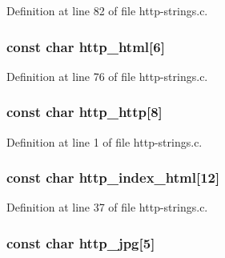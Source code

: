 Definition at line 82 of file http-\/strings.c.

\hypertarget{http-strings_8h_ac61a385f177ab70118739cc3e38c11af}{
\subsubsection[{http\_\-html}]{\setlength{\rightskip}{0pt plus 5cm}const char {\bf http\_\-html}\mbox{[}6\mbox{]}}}
\label{http-strings_8h_ac61a385f177ab70118739cc3e38c11af}


Definition at line 76 of file http-\/strings.c.

\hypertarget{http-strings_8h_acaaccd24059edb3f7a8182b1d6b83c78}{
\subsubsection[{http\_\-http}]{\setlength{\rightskip}{0pt plus 5cm}const char {\bf http\_\-http}\mbox{[}8\mbox{]}}}
\label{http-strings_8h_acaaccd24059edb3f7a8182b1d6b83c78}


Definition at line 1 of file http-\/strings.c.

\hypertarget{http-strings_8h_ae3489af8c42b05e3c9f786e3f7be2d2f}{
\subsubsection[{http\_\-index\_\-html}]{\setlength{\rightskip}{0pt plus 5cm}const char {\bf http\_\-index\_\-html}\mbox{[}12\mbox{]}}}
\label{http-strings_8h_ae3489af8c42b05e3c9f786e3f7be2d2f}


Definition at line 37 of file http-\/strings.c.

\hypertarget{http-strings_8h_acecfa49a95be67df62b2421efe1d5be3}{
\subsubsection[{http\_\-jpg}]{\setlength{\rightskip}{0pt plus 5cm}const char {\bf http\_\-jpg}\mbox{[}5\mbox{]}}}
\label{http-strings_8h_acecfa49a95be67df62b2421efe1d5be3}


